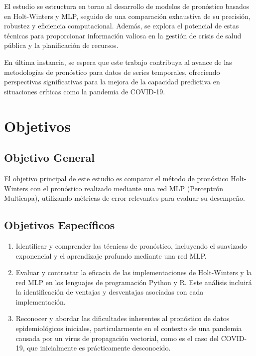 \documentclass[
  us-letterpaper,
]{scrreprt}
\theoremstyle{definition}
\theoremstyle{plain}
\theoremstyle{plain}
\theoremstyle{definition}
\theoremstyle{remark}
\begin{document}
El estudio se estructura en torno al desarrollo de modelos de pronóstico
basados en Holt-Winters y MLP, seguido de una comparación exhaustiva de
su precisión, robustez y eficiencia computacional. Además, se explora el
potencial de estas técnicas para proporcionar información valiosa en la
gestión de crisis de salud pública y la planificación de recursos.

En última instancia, se espera que este trabajo contribuya al avance de
las metodologías de pronóstico para datos de series temporales,
ofreciendo perspectivas significativas para la mejora de la capacidad
predictiva en situaciones críticas como la pandemia de COVID-19.


\chapter*{Objetivos}\label{objetivos}


\section*{Objetivo General}\label{objetivo-general}


El objetivo principal de este estudio es comparar el método de
pronóstico Holt-Winters con el pronóstico realizado mediante una red MLP
(Perceptrón Multicapa), utilizando métricas de error relevantes para
evaluar su desempeño.

\section*{Objetivos Específicos}\label{objetivos-especuxedficos}


\begin{enumerate}
\def\labelenumi{\arabic{enumi}.}
\item
  Identificar y comprender las técnicas de pronóstico, incluyendo el
  suavizado exponencial y el aprendizaje profundo mediante una red MLP.
\item
  Evaluar y contrastar la eficacia de las implementaciones de
  Holt-Winters y la red MLP en los lenguajes de programación Python y R.
  Este análisis incluirá la identificación de ventajas y desventajas
  asociadas con cada implementación.
\item
  Reconocer y abordar las dificultades inherentes al pronóstico de datos
  epidemiológicos iniciales, particularmente en el contexto de una
  pandemia causada por un virus de propagación vectorial, como es el
  caso del COVID-19, que inicialmente es prácticamente desconocido.
\end{enumerate}
\end{document}
